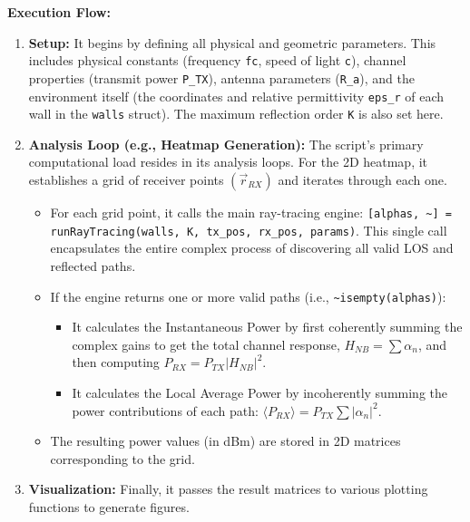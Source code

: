 \documentclass{article}
\begin{document}
	\textbf{Execution Flow:}
	\begin{enumerate}
		\item \textbf{Setup:} It begins by defining all physical and geometric parameters. This includes physical constants (frequency \texttt{fc}, speed of light \texttt{c}), channel properties (transmit power \texttt{P\_TX}), antenna parameters (\texttt{R\_a}), and the environment itself (the coordinates and relative permittivity \texttt{eps\_r} of each wall in the \texttt{walls} struct). The maximum reflection order \texttt{K} is also set here.
		\item \textbf{Analysis Loop (e.g., Heatmap Generation):} The script's primary computational load resides in its analysis loops. For the 2D heatmap, it establishes a grid of receiver points $(\vec{r}_{RX})$ and iterates through each one.
		\begin{itemize}
			\item For each grid point, it calls the main ray-tracing engine: \texttt{[alphas, \textasciitilde] = runRayTracing(walls, K, tx\_pos, rx\_pos, params)}. This single call encapsulates the entire complex process of discovering all valid LOS and reflected paths.
			\item If the engine returns one or more valid paths (i.e., \texttt{\textasciitilde isempty(alphas)}):
			\begin{itemize}
				\item It calculates the Instantaneous Power by first coherently summing the complex gains to get the total channel response, $H_{NB} = \sum \alpha_n$, and then computing $P_{RX} = P_{TX} |H_{NB}|^2$.
				\item It calculates the Local Average Power by incoherently summing the power contributions of each path: $\langle P_{RX} \rangle = P_{TX} \sum |\alpha_n|^2$.
			\end{itemize}
			\item The resulting power values (in dBm) are stored in 2D matrices corresponding to the grid.
		\end{itemize}
		\item \textbf{Visualization:} Finally, it passes the result matrices to various plotting functions to generate figures.
	\end{enumerate}
	
	
	
\end{document}
